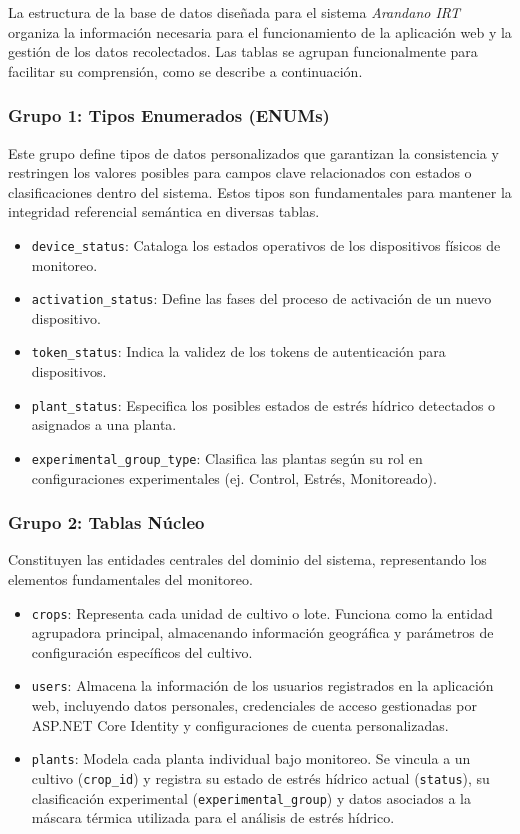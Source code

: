 La estructura de la base de datos diseñada para el sistema \textit{Arandano IRT} organiza la información necesaria para el funcionamiento de la aplicación web y la gestión de los datos recolectados.  Las tablas se agrupan funcionalmente para facilitar su comprensión, como se describe a continuación.

\subsubsection*{Grupo 1: Tipos Enumerados (ENUMs)}
Este grupo define tipos de datos personalizados que garantizan la consistencia y restringen los valores posibles para campos clave relacionados con estados o clasificaciones dentro del sistema. Estos tipos son fundamentales para mantener la integridad referencial semántica en diversas tablas.
\begin{itemize}
    \item \texttt{device\_status}: Cataloga los estados operativos de los dispositivos físicos de monitoreo.
    \item \texttt{activation\_status}: Define las fases del proceso de activación de un nuevo dispositivo.
    \item \texttt{token\_status}: Indica la validez de los tokens de autenticación para dispositivos.
    \item \texttt{plant\_status}: Especifica los posibles estados de estrés hídrico detectados o asignados a una planta.
    \item \texttt{experimental\_group\_type}: Clasifica las plantas según su rol en configuraciones experimentales (ej. Control, Estrés, Monitoreado).
\end{itemize}

\subsubsection*{Grupo 2: Tablas Núcleo}
Constituyen las entidades centrales del dominio del sistema, representando los elementos fundamentales del monitoreo.
\begin{itemize}
    \item \texttt{crops}: Representa cada unidad de cultivo o lote. Funciona como la entidad agrupadora principal, almacenando información geográfica y parámetros de configuración específicos del cultivo.
    \item \texttt{users}: Almacena la información de los usuarios registrados en la aplicación web, incluyendo datos personales, credenciales de acceso gestionadas por ASP.NET Core Identity y configuraciones de cuenta personalizadas.
    \item \texttt{plants}: Modela cada planta individual bajo monitoreo. Se vincula a un cultivo (\texttt{crop\_id}) y registra su estado de estrés hídrico actual (\texttt{status}), su clasificación experimental (\texttt{experimental\_group}) y datos asociados a la máscara térmica utilizada para el análisis de estrés hídrico.
\end{itemize}

